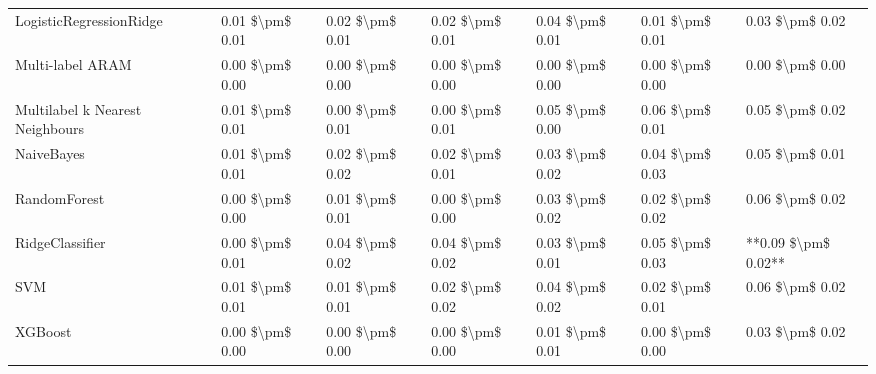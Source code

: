 \begin{tabular}{lllllll}
        LogisticRegressionRidge & 0.01 \$\textbackslash pm\$ 0.01 &           0.02 \$\textbackslash pm\$ 0.01 &       0.02 \$\textbackslash pm\$ 0.01 &        0.04 \$\textbackslash pm\$ 0.01 &                         0.01 \$\textbackslash pm\$ 0.01 &     0.03 \$\textbackslash pm\$ 0.02 \\
               Multi-label ARAM & 0.00 \$\textbackslash pm\$ 0.00 &           0.00 \$\textbackslash pm\$ 0.00 &       0.00 \$\textbackslash pm\$ 0.00 &        0.00 \$\textbackslash pm\$ 0.00 &                         0.00 \$\textbackslash pm\$ 0.00 &     0.00 \$\textbackslash pm\$ 0.00 \\
Multilabel k Nearest Neighbours & 0.01 \$\textbackslash pm\$ 0.01 &           0.00 \$\textbackslash pm\$ 0.01 &       0.00 \$\textbackslash pm\$ 0.01 &        0.05 \$\textbackslash pm\$ 0.00 &                         0.06 \$\textbackslash pm\$ 0.01 &     0.05 \$\textbackslash pm\$ 0.02 \\
                     NaiveBayes & 0.01 \$\textbackslash pm\$ 0.01 &           0.02 \$\textbackslash pm\$ 0.02 &       0.02 \$\textbackslash pm\$ 0.01 &        0.03 \$\textbackslash pm\$ 0.02 &                         0.04 \$\textbackslash pm\$ 0.03 &     0.05 \$\textbackslash pm\$ 0.01 \\
                   RandomForest & 0.00 \$\textbackslash pm\$ 0.00 &           0.01 \$\textbackslash pm\$ 0.01 &       0.00 \$\textbackslash pm\$ 0.00 &        0.03 \$\textbackslash pm\$ 0.02 &                         0.02 \$\textbackslash pm\$ 0.02 &     0.06 \$\textbackslash pm\$ 0.02 \\
                RidgeClassifier & 0.00 \$\textbackslash pm\$ 0.01 &           0.04 \$\textbackslash pm\$ 0.02 &       0.04 \$\textbackslash pm\$ 0.02 &        0.03 \$\textbackslash pm\$ 0.01 &                         0.05 \$\textbackslash pm\$ 0.03 & **0.09 \$\textbackslash pm\$ 0.02** \\
                            SVM & 0.01 \$\textbackslash pm\$ 0.01 &           0.01 \$\textbackslash pm\$ 0.01 &       0.02 \$\textbackslash pm\$ 0.02 &        0.04 \$\textbackslash pm\$ 0.02 &                         0.02 \$\textbackslash pm\$ 0.01 &     0.06 \$\textbackslash pm\$ 0.02 \\
                        XGBoost & 0.00 \$\textbackslash pm\$ 0.00 &           0.00 \$\textbackslash pm\$ 0.00 &       0.00 \$\textbackslash pm\$ 0.00 &        0.01 \$\textbackslash pm\$ 0.01 &                         0.00 \$\textbackslash pm\$ 0.00 &     0.03 \$\textbackslash pm\$ 0.02 \\
\bottomrule
\end{tabular}
